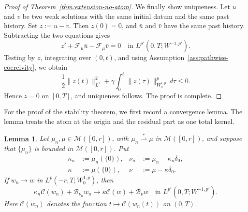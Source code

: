 \documentclass[a4paper,11pt,oneside,reqno]{amsart}
\newtheorem{lemma}[theorem]{Lemma}
\newcounter{c}
\newcounter{d}
\newcounter{b}
\newcommand{\M}{\mathcal{M}}
\begin{document}
\begin{proof}[Proof of Theorem~\ref{thm:extension-no-atom}]
We finally show uniqueness. Let \(u\) and \(v\) be two weak solutions
with the same initial datum and the same past history. Set \(z:=u-v\).
Then \(z(0)=0\), and \(\bar u\) and \(\bar v\) have the same past history.
Subtracting the two equations gives
\[
 z'
 +
 \mathcal F_\mu\bar u
 -
 \mathcal F_\mu\bar v
 =
 0
 \quad\text{in }L^{p'}(0,T;W^{-1,p'}).
\]
Testing by \(z\), integrating over \((0,t)\), and using
Assumption~\ref{ass:pathwise-coercivity}, we obtain
\[
 \frac12\|z(t)\|_{L^2}^2
 +
 \gamma\int_0^t
 \|z(\tau)\|_{W^{1,p}_0}^p\,d\tau
 \le0 .
\]
Hence \(z=0\) on \([0,T]\), and uniqueness follows. The proof is complete.
\end{proof}

For the proof of the stability theorem, we first record a convergence lemma.
The lemma treats the atom at the origin and the residual part as one total kernel.

\begin{lemma}\label{lem:fixed-path-total-kernel}
Let \(\mu_n,\mu\in\M([0,r])\), with
\(\mu_n\stackrel{*}{\rightharpoonup}\mu\) in \(\M([0,r])\), and suppose
that \(\{\mu_n\}\) is bounded in \(\M([0,r])\). Put
\[
\begin{aligned}
 \kappa_n&:=\mu_n(\{0\}),&
 \nu_n&:=\mu_n-\kappa_n\delta_0,\\
 \kappa&:=\mu(\{0\}),&
 \nu&:=\mu-\kappa\delta_0 .
\end{aligned}
\]
If \(w_n\to w\) in \(L^p(-r,T;W^{1,p}_0)\), then
\begin{equation}
 \kappa_n\mathcal C(w_n)
 +\mathcal B_{\nu_n}w_n
 \to
 \kappa\mathcal C(w)
 +\mathcal B_\nu w
 \quad\text{in }L^{p'}(0,T;W^{-1,p'}).
 \label{eq:fixed-path-total-kernel}
\end{equation}
Here \(\mathcal C(w_n)\) denotes the function
\(t\mapsto\mathcal C(w_n(t))\) on \((0,T)\).
\end{lemma}
\end{document}
